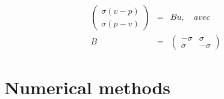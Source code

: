 \documentclass[a4paper,11pt]{article}
\begin{document}
\begin{equation*}
\begin{array}{rcl}
    \begin{pmatrix}
        \sigma(v-p) \\
        \sigma(p-v)
    \end{pmatrix} &=&
    Bu, \quad avec \\
    B &=&
    \begin{pmatrix}
        -\sigma & \sigma \\
        \sigma & -\sigma
    \end{pmatrix}
\end{array}
\end{equation*}

\section{}

\part{Numerical methods}

\section{}
\end{document}
